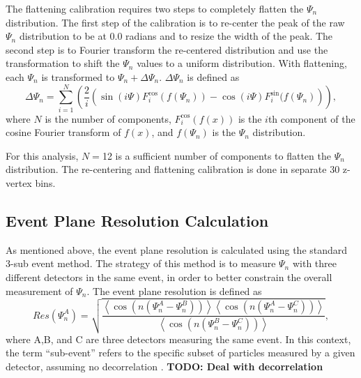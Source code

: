 The flattening calibration requires two steps to completely flatten the $\Psi_n$ distribution. The first step of the calibration is to re-center the peak of the raw $\Psi_n$ distribution to be at 
0.0 radians and to resize the width of the peak. The second step is to Fourier transform the re-centered distribution and use the transformation to shift the $\Psi_n$ values to a uniform distribution. With flattening, each $\Psi_n$ is transformed to $\Psi_n + \Delta\Psi_n$. $\Delta\Psi_n$ is defined as
\begin{equation}
\Delta\Psi_n = \sum^{N}_{i=1}\left(\frac{2}{i}\left(\sin(i \Psi)F^{\cos}_{i}(f(\Psi_n))-\cos(i \Psi)F^{\sin}_{i}(f(\Psi_n)\right)\right),
\label{eq:deltapsi}
\end{equation}
where $N$ is the number of components, $F^{\cos}_{i}(f(x))$ is the $i$th component of the cosine Fourier transform of $f(x)$, and $f(\Psi_n)$ is the $\Psi_n$ distribution.

For this analysis, $N=$12 is a sufficient number of components to flatten the $\Psi_n$ distribution. The re-centering and flattening calibration is done in separate 30 z-vertex bins.

\subsection{Event Plane Resolution Calculation}
As mentioned above, the event plane resolution is calculated using the standard 3-sub event method\cite{PhysRevC.58.1671}. The strategy of this method is to measure $\Psi_n$ with three
different detectors in the same event, in order to better constrain the overall measurement of $\Psi_n$. The event plane resolution is defined as
\begin{equation}
Res(\Psi_n^A) = \sqrt{\frac{\left<\cos(n(\Psi_n^A - \Psi_n^B))\right>\left<\cos(n(\Psi_n^A - \Psi_n^C))\right>}{\left<\cos(n(\Psi_n^B - \Psi_n^C))\right>}},
\label{eqn:res}
\end{equation}
where A,B, and C are three detectors measuring the same event. In this context, the term ``sub-event'' refers to the specific subset of particles measured by a given detector, assuming no decorrelation \cite{PhysRevC.58.1671}. \textbf{TODO: Deal with decorrelation}

